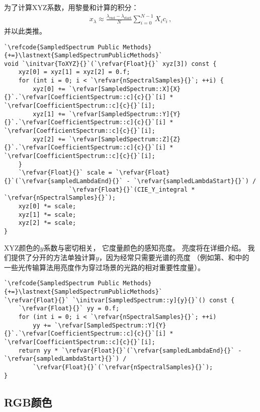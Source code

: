 为了计算XYZ系数，用黎曼和计算的积分：
\begin{align*}
    x_{\lambda}\approx\frac{\lambda_{\text{end}}-\lambda_{\text{start}}}{N}\sum\limits_{i=0}^{N-1}{X_ic_i}\, ,
\end{align*}
并以此类推。
\begin{lstlisting}
`\refcode{SampledSpectrum Public Methods}{+=}\lastnext{SampledSpectrumPublicMethods}`
void `\initvar{ToXYZ}{}`(`\refvar{Float}{}` xyz[3]) const {
    xyz[0] = xyz[1] = xyz[2] = 0.f;
    for (int i = 0; i < `\refvar{nSpectralSamples}{}`; ++i) {
        xyz[0] += `\refvar[SampledSpectrum::X]{X}{}`.`\refvar[CoefficientSpectrum::c]{c}{}`[i] * `\refvar[CoefficientSpectrum::c]{c}{}`[i];
        xyz[1] += `\refvar[SampledSpectrum::Y]{Y}{}`.`\refvar[CoefficientSpectrum::c]{c}{}`[i] * `\refvar[CoefficientSpectrum::c]{c}{}`[i];
        xyz[2] += `\refvar[SampledSpectrum::Z]{Z}{}`.`\refvar[CoefficientSpectrum::c]{c}{}`[i] * `\refvar[CoefficientSpectrum::c]{c}{}`[i];
    }
    `\refvar{Float}{}` scale = `\refvar{Float}{}`(`\refvar{sampledLambdaEnd}{}` - `\refvar{sampledLambdaStart}{}`) /
                  `\refvar{Float}{}`(CIE_Y_integral * `\refvar{nSpectralSamples}{}`);
    xyz[0] *= scale;
    xyz[1] *= scale;
    xyz[2] *= scale;
}
\end{lstlisting}

XYZ颜色的$y$系数与密切相关，
它度量颜色的感知亮度。
亮度将在详细介绍。
我们提供了分开的方法单独计算$y$，因为经常只需要光谱的亮度
（例如第、和中的
一些光传输算法用亮度作为穿过场景的光路的相对重要性度量）。
\begin{lstlisting}
`\refcode{SampledSpectrum Public Methods}{+=}\lastnext{SampledSpectrumPublicMethods}`
`\refvar{Float}{}` `\initvar[SampledSpectrum::y]{y}{}`() const { 
    `\refvar{Float}{}` yy = 0.f;
    for (int i = 0; i < `\refvar{nSpectralSamples}{}`; ++i)
        yy += `\refvar[SampledSpectrum::Y]{Y}{}`.`\refvar[CoefficientSpectrum::c]{c}{}`[i] * `\refvar[CoefficientSpectrum::c]{c}{}`[i];
    return yy * `\refvar{Float}{}`(`\refvar{sampledLambdaEnd}{}` - `\refvar{sampledLambdaStart}{}`) /
        `\refvar{Float}{}`(`\refvar{nSpectralSamples}{}`);
}
\end{lstlisting}

\subsection{RGB颜色}\label{sub:RGB颜色}

